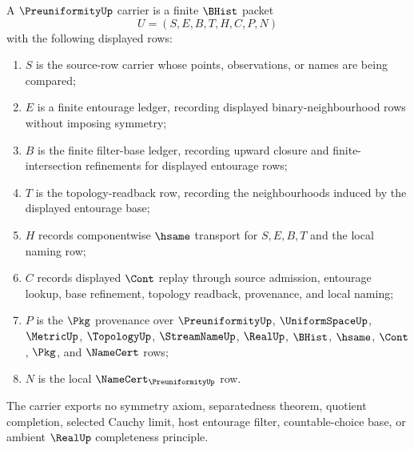 \begin{definition}
\label{def:preuniformity-carrier}
A $\PreuniformityUp$ carrier is a finite $\BHist$ packet
$$
U=(S,E,B,T,H,C,P,N)
$$
with the following displayed rows:
\begin{enumerate}
\item $S$ is the source-row carrier whose points, observations, or names are being compared;
\item $E$ is a finite entourage ledger, recording displayed binary-neighbourhood rows without imposing symmetry;
\item $B$ is the finite filter-base ledger, recording upward closure and finite-intersection refinements for displayed entourage rows;
\item $T$ is the topology-readback row, recording the neighbourhoods induced by the displayed entourage base;
\item $H$ records componentwise $\hsame$ transport for $S,E,B,T$ and the local naming row;
\item $C$ records displayed $\Cont$ replay through source admission, entourage lookup, base refinement, topology readback, provenance, and local naming;
\item $P$ is the $\Pkg$ provenance over $\PreuniformityUp$, $\UniformSpaceUp$, $\MetricUp$, $\TopologyUp$, $\StreamNameUp$, $\RealUp$, $\BHist$, $\hsame$, $\Cont$, $\Pkg$, and $\NameCert$ rows;
\item $N$ is the local $\NameCert_{\PreuniformityUp}$ row.
\end{enumerate}
The carrier exports no symmetry axiom, separatedness theorem, quotient completion, selected Cauchy limit, host entourage filter, countable-choice base, or ambient $\RealUp$ completeness principle.
\end{definition}

